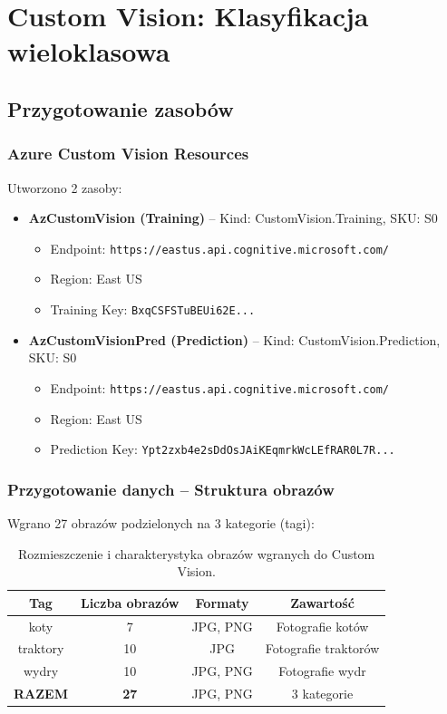 \section{Custom Vision: Klasyfikacja wieloklasowa}

\subsection{Przygotowanie zasobów}

\subsubsection{Azure Custom Vision Resources}

Utworzono 2 zasoby:

\begin{itemize}
	\item \textbf{AzCustomVision (Training)} – Kind: CustomVision.Training, SKU: S0
	\begin{itemize}
		\item Endpoint: \texttt{https://eastus.api.cognitive.microsoft.com/}
		\item Region: East US
		\item Training Key: \texttt{BxqCSFSTuBEUi62E...}
	\end{itemize}
	
	\item \textbf{AzCustomVisionPred (Prediction)} – Kind: CustomVision.Prediction, SKU: S0
	\begin{itemize}
		\item Endpoint: \texttt{https://eastus.api.cognitive.microsoft.com/}
		\item Region: East US
		\item Prediction Key: \texttt{Ypt2zxb4e2sDdOsJAiKEqmrkWcLEfRAR0L7R...}
	\end{itemize}
\end{itemize}

\subsubsection{Przygotowanie danych – Struktura obrazów}

Wgrano 27 obrazów podzielonych na 3 kategorie (tagi):

\begin{table}[H]
	\centering
	\begin{tabular}{|c|c|c|c|}
		\hline
		\textbf{Tag} & \textbf{Liczba obrazów} & \textbf{Formaty} & \textbf{Zawartość} \\
		\hline
		koty & 7 & JPG, PNG & Fotografie kotów \\
		\hline
		traktory & 10 & JPG & Fotografie traktorów \\
		\hline
		wydry & 10 & JPG, PNG & Fotografie wydr \\
		\hline
		\textbf{RAZEM} & \textbf{27} & JPG, PNG & 3 kategorie \\
		\hline
	\end{tabular}
	\caption{Rozmieszczenie i charakterystyka obrazów wgranych do Custom Vision.}
\end{table}

